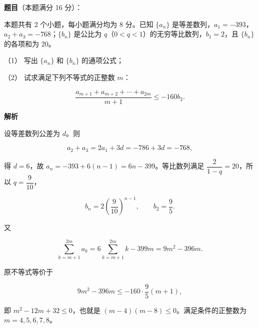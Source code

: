 \begin{answer}

\textbf{题目}（本题满分 16 分）：

本题共有 2 个小题，每小题满分均为 8 分。已知 $\{a_n\}$ 是等差数列，$a_1=-393$，$a_2+a_3=-768$；$\{b_n\}$ 是公比为 $q$（$0<q<1$）的无穷等比数列，$b_1=2$，且 $\{b_n\}$ 的各项和为 20。

（1） 写出 $\{a_n\}$ 和 $\{b_n\}$ 的通项公式；

（2） 试求满足下列不等式的正整数 $m$：

\nopagebreak[4]
\[
\frac{a_{m+1}+a_{m+2}+\cdots+a_{2m}}{m+1}\le -160b_2.
\]

\textbf{解析}


设等差数列公差为 $d$。则

\nopagebreak[4]
\[
a_2+a_3=2a_1+3d=-786+3d=-768,
\]

得 $d=6$，故 $a_n=-393+6(n-1)=6n-399$。等比数列满足 $\dfrac{2}{1-q}=20$，所以 $q=\dfrac9{10}$，

\nopagebreak[4]
\[
b_n=2\left(\frac9{10}\right)^{n-1},\qquad b_2=\frac95.
\]


又

\nopagebreak[4]
\[
\sum_{k=m+1}^{2m}a_k=6\sum_{k=m+1}^{2m}k-399m=9m^2-396m.
\]

原不等式等价于

\nopagebreak[4]
\[
9m^2-396m\le-160\cdot\frac95(m+1),
\]

即 $m^2-12m+32\le0$，也就是 $(m-4)(m-8)\le0$。满足条件的正整数为 $m=4,5,6,7,8$。



\end{answer}
